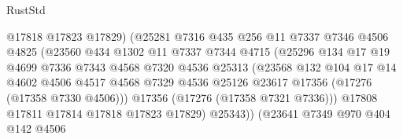 \begin{lexlean}{RustStd}
\begin{coremodule}
                                  @17818
                                  @17823
                                  @17829)
                                (@25281
                                  @7316
                                  @435
                                  @256
                                  @11
                                  @7337
                                  @7346
                                  @4506
                                  @4825
                                  (@23560
                                    @434
                                    @1302
                                    @11
                                    @7337
                                    @7344
                                    @4715
                                    (@25296
                                      @134
                                      @17
                                      @19
                                      @4699
                                      @7336
                                      @7343
                                      @4568
                                      @7320
                                      @4536
                                      @25313
                                      (@23568
                                        @132
                                        @104
                                        @17
                                        @14
                                        @4602
                                        @4506
                                        @4517
                                        @4568
                                        @7329
                                        @4536
                                        @25126
                                        @23617
                                        @17356
                                        (@17276 (@17358 @7330 @4506)))
                                      @17356
                                      (@17276 (@17358 @7321 @7336)))
                                    @17808
                                    @17811
                                    @17814
                                    @17818
                                    @17823
                                    @17829)
                                  @25343))
                              (@23641
                                @7349
                                @970
                                @404
                                @142
                                @4506

\end{coremodule}
\end{lexlean}
